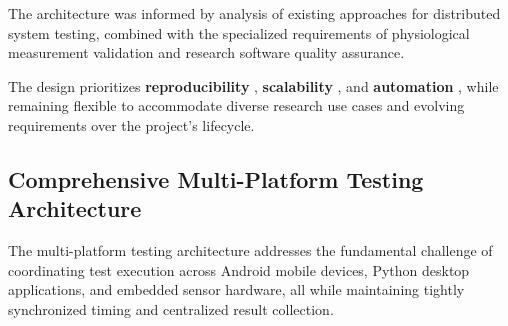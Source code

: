 {{{The architecture was informed by analysis of existing approaches for distributed system testing, combined with the specialized requirements of physiological measurement validation and research software quality assurance.

The design prioritizes \textbf{reproducibility}
, \textbf{scalability}
, and \textbf{automation}
, while remaining flexible to accommodate diverse research use cases and evolving requirements over the project's lifecycle.

\subsection{Comprehensive Multi-Platform Testing Architecture}

The multi-platform testing architecture addresses the fundamental challenge of coordinating test execution across Android mobile devices, Python desktop applications, and embedded sensor hardware, all while maintaining tightly synchronized timing and centralized result collection.

}}}
